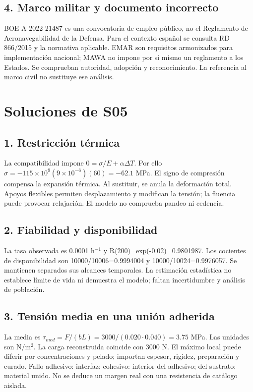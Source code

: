 \section{4. Marco militar y documento incorrecto}
BOE-A-2022-21487 es una convocatoria de empleo público, no el Reglamento de Aeronavegabilidad de la Defensa. Para el contexto español se consulta RD 866/2015 y la normativa aplicable. EMAR son requisitos armonizados para implementación nacional; MAWA no impone por sí mismo un reglamento a los Estados. Se comprueban autoridad, adopción y reconocimiento. La referencia al marco civil no sustituye ese análisis.

\chapter{Soluciones de S05}
\section{1. Restricción térmica}
La compatibilidad impone $0=\sigma/E+\alpha\Delta T$. Por ello $\sigma=-115\times10^9(9\times10^{-6})(60)=-62.1$ MPa. El signo de compresión compensa la expansión térmica. Al sustituir, se anula la deformación total. Apoyos flexibles permiten desplazamiento y modifican la tensión; la fluencia puede provocar relajación. El modelo no comprueba pandeo ni cedencia.



\section{2. Fiabilidad y disponibilidad}
La tasa observada es 0.0001 h\(^{-1}\) y R(200)=exp(-0.02)=0.9801987. Los cocientes de disponibilidad son 10000/10006=0.9994004 y 10000/10024=0.9976057. Se mantienen separados sus alcances temporales. La estimación estadística no establece límite de vida ni demuestra el modelo; faltan incertidumbre y análisis de población.



\section{3. Tensión media en una unión adherida}
La media es $\tau_{med}=F/(bL)=3000/(0.020\cdot0.040)=3.75$ MPa. Las unidades son N/m\(^{2}\). La carga reconstruida coincide con 3000 N. El máximo local puede diferir por concentraciones y pelado; importan espesor, rigidez, preparación y curado. Fallo adhesivo: interfaz; cohesivo: interior del adhesivo; del sustrato: material unido. No se deduce un margen real con una resistencia de catálogo aislada.


